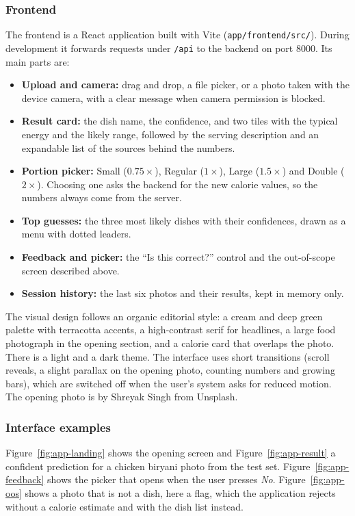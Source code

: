 \subsubsection{Frontend}
The frontend is a React application built with Vite
(\texttt{app/frontend/src/}). During development it forwards requests under
\texttt{/api} to the backend on port 8000. Its main parts are:
\begin{itemize}
  \item \textbf{Upload and camera:} drag and drop, a file picker, or a photo taken
        with the device camera, with a clear message when camera permission is
        blocked.
  \item \textbf{Result card:} the dish name, the confidence, and two tiles with
        the typical energy and the likely range, followed by the serving
        description and an expandable list of the sources behind the numbers.
  \item \textbf{Portion picker:} Small ($0.75\times$), Regular ($1\times$), Large
        ($1.5\times$) and Double ($2\times$). Choosing one asks the backend for
        the new calorie values, so the numbers always come from the server.
  \item \textbf{Top guesses:} the three most likely dishes with their
        confidences, drawn as a menu with dotted leaders.
  \item \textbf{Feedback and picker:} the ``Is this correct?'' control and the
        out-of-scope screen described above.
  \item \textbf{Session history:} the last six photos and their results, kept in
        memory only.
\end{itemize}
The visual design follows an organic editorial style: a cream and deep green
palette with terracotta accents, a high-contrast serif for headlines, a large
food photograph in the opening section, and a calorie card that overlaps the
photo. There is a light and a dark theme. The interface uses short transitions
(scroll reveals, a slight parallax on the opening photo, counting numbers and
growing bars), which are switched off when the user's system asks for reduced
motion. The opening photo is by Shreyak Singh from Unsplash.

\subsubsection{Interface examples}
Figure~\ref{fig:app-landing} shows the opening screen and Figure~\ref{fig:app-result}
a confident prediction for a chicken biryani photo from the test set.
Figure~\ref{fig:app-feedback} shows the picker that opens when the user presses
\emph{No}. Figure~\ref{fig:app-oos} shows a photo that is not a dish, here a flag,
which the application rejects without a calorie estimate and with the dish list
instead.

